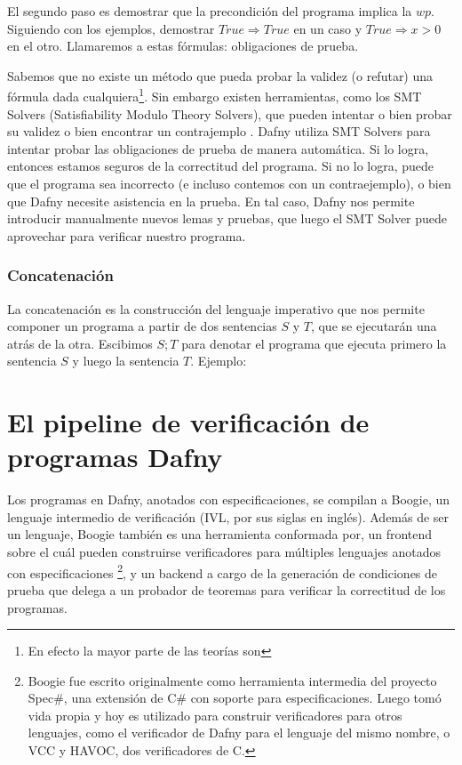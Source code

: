 \documentclass[12pt, a4paper, openany, fleqn]{book}
\begin{document}
    El segundo paso es demostrar que la precondición del programa implica la $wp$.
    Siguiendo con los ejemplos, demostrar $True \Rightarrow True$ en un caso y $True \Rightarrow x > 0$ en el otro.
    Llamaremos a estas fórmulas: obligaciones de prueba.

    Sabemos que no existe un método que pueda probar la validez (o refutar) una fórmula dada cualquiera\footnote{En efecto la mayor parte de las teorías son }. Sin embargo existen herramientas, como los SMT Solvers (Satisfiability Modulo Theory Solvers), que pueden intentar o bien probar su validez o bien encontrar un contrajemplo \cite{10.1007/978-3-030-99524-9_23}. Dafny utiliza SMT Solvers para intentar probar las obligaciones de prueba de manera automática. Si lo logra, entonces estamos seguros de la correctitud del programa. Si no lo logra, puede que el programa sea incorrecto (e incluso contemos con un contraejemplo), o bien que Dafny necesite asistencia en la prueba. En tal caso, Dafny nos permite introducir manualmente nuevos lemas y pruebas, que luego el SMT Solver puede aprovechar para verificar nuestro programa.

    \subsection{Concatenación}
    La concatenación es la construcción del lenguaje imperativo que nos permite componer un programa a partir de dos sentencias $S$ y $T$, que se ejecutarán una atrás de la otra.
    Escibimos $S;T$ para denotar el programa que ejecuta primero la sentencia $S$ y luego la sentencia $T$.
    Ejemplo:

    \chapter{El pipeline de verificación de programas Dafny}
    Los programas en Dafny, anotados con especificaciones, se compilan a Boogie, un lenguaje intermedio de verificación (IVL, por sus siglas en inglés).
    Además de ser un lenguaje, Boogie también es una herramienta conformada por, un frontend sobre el cuál pueden construirse verificadores para múltiples lenguajes anotados con especificaciones
    \footnote{
        Boogie fue escrito originalmente como herramienta intermedia del proyecto Spec\#, una extensión de C\# con soporte para especificaciones. Luego tomó vida propia y hoy es utilizado para construir verificadores para otros lenguajes, como el verificador de Dafny para el lenguaje del mismo nombre, o VCC y HAVOC, dos verificadores de C.
    },
    y un backend a cargo de la generación de condiciones de prueba que delega a un probador de teoremas para verificar la correctitud de los programas.
\end{document}

